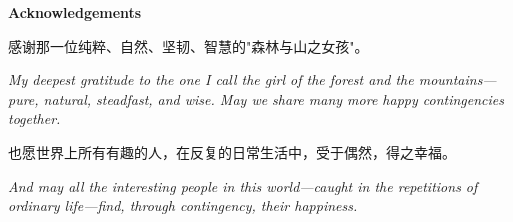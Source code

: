 \newpage
\goldrule
\begin{center}
{\large\bfseries\color{rosedeep} Acknowledgements}
\end{center}
\goldrule

\vspace{0.8em}

\noindent
{\cjk 感谢那一位纯粹、自然、坚韧、智慧的"森林与山之女孩"。}

\vspace{0.4em}

\noindent
\textit{My deepest gratitude to the one I call the girl of the forest and the mountains---pure, natural, steadfast, and wise. May we share many more happy contingencies together.}

\vspace{1.2em}

\noindent
{\cjk 也愿世界上所有有趣的人，在反复的日常生活中，受于偶然，得之幸福。}

\vspace{0.4em}

\noindent
\textit{And may all the interesting people in this world---caught in the repetitions of ordinary life---find, through contingency, their happiness.}

\vspace{1.8em}

\goldrule
